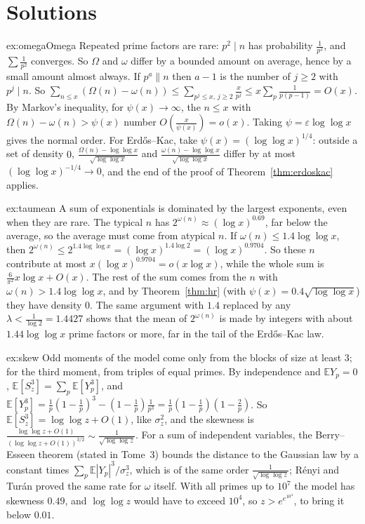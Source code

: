 \section{Solutions}

\begin{solution}{ex:omegaOmega}
\idea Repeated prime factors are rare: $p^2\mid n$ has probability $\frac1{p^2}$, and $\sum\frac1{p^2}$ converges. So $\Omega$ and $\omega$ differ by a bounded amount on average, hence by a small amount almost always.
\writeup If $p^a\|n$ then $a-1$ is the number of $j\ge2$ with $p^j\mid n$. So $\sum_{n\le x}(\Omega(n)-\omega(n))\le\sum_{p^j\le x,\,j\ge2}\frac x{p^j}\le x\sum_p\frac1{p(p-1)}=O(x)$. By Markov's inequality, for $\psi(x)\to\infty$, the
$n\le x$ with $\Omega(n)-\omega(n)>\psi(x)$ number $O(\frac x{\psi(x)})=o(x)$. Taking $\psi=\varepsilon\log\log x$ gives the normal order. For Erd\H{o}s--Kac, take $\psi(x)=(\log\log x)^{1/4}$: outside a set of density $0$,
$\frac{\Omega(n)-\log\log x}{\sqrt{\log\log x}}$ and $\frac{\omega(n)-\log\log x}{\sqrt{\log\log x}}$ differ by at most $(\log\log x)^{-1/4}\to0$, and the end of the proof of Theorem~\ref{thm:erdoskac} applies.
\end{solution}

\begin{solution}{ex:taumean}
\idea A sum of exponentials is dominated by the largest exponents, even when they are rare. The typical $n$ has $2^{\omega(n)}\approx(\log x)^{0.69}$, far below the average, so the average must come from atypical $n$.
\writeup If $\omega(n)\le1.4\log\log x$, then $2^{\omega(n)}\le2^{1.4\log\log x}=(\log x)^{1.4\log2}=(\log x)^{0.9704}$. So these $n$ contribute at most $x(\log x)^{0.9704}=o(x\log x)$, while the whole sum is
$\frac6{\pi^2}x\log x+O(x)$. The rest of the sum comes from the $n$ with $\omega(n)>1.4\log\log x$, and by Theorem~\ref{thm:hr} (with $\psi(x)=0.4\sqrt{\log\log x}$) they have density $0$. The same argument with
$1.4$ replaced by any $\lambda<\frac1{\log2}=1.4427$ shows that the mean of $2^{\omega(n)}$ is made by integers with about $1.44\log\log x$ prime factors or more, far in the tail of the Erd\H{o}s--Kac law.
\end{solution}

\begin{solution}{ex:skew}
\idea Odd moments of the model come only from the blocks of size at least $3$; for the third moment, from triples of equal primes.
\writeup By independence and $\mathbb E Y_p=0$, $\mathbb E[S_z^3]=\sum_p\mathbb E[Y_p^3]$, and $\mathbb E[Y_p^3]=\frac1p(1-\frac1p)^3-(1-\frac1p)\frac1{p^3}=\frac1p(1-\frac1p)(1-\frac2p)$. So $\mathbb E[S_z^3]=\log\log z+O(1)$, like $\sigma_z^2$,
and the skewness is $\frac{\log\log z+O(1)}{(\log\log z+O(1))^{3/2}}\sim\frac1{\sqrt{\log\log z}}$. For a sum of independent variables, the Berry--Esseen theorem (stated in Tome~3) bounds the distance to the Gaussian law by a constant times $\sum_p\mathbb E|Y_p|^3/\sigma_z^3$, which is of the same order $\frac1{\sqrt{\log\log z}}$; Rényi and Turán proved the same rate for $\omega$ itself. With all primes up to $10^7$
the model has skewness $0.49$, and $\log\log z$ would have to exceed $10^4$, so $z>e^{e^{10^4}}$, to bring it below $0.01$.
\end{solution}


